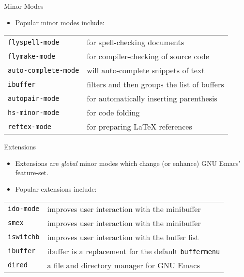 \documentclass[12pt,a4paper,oneside]{beamer}
\begin{document}
\begin{frame}{Minor Modes}
\begin{itemize}
  \item Popular minor modes include:
\end{itemize}
\begin{multicols}
  \begin{tabular}{@{}ll@{}}
  \texttt{flyspell-mode} & for spell-checking documents\\
  \texttt{flymake-mode} & for compiler-checking of source code\\
  \texttt{auto-complete-mode} & will auto-complete snippets of text\\
  \texttt{ibuffer} & filters and then groups the list of buffers\\
  \texttt{autopair-mode} & for automatically inserting parenthesis\\
  \texttt{hs-minor-mode} & for code folding\\
  \texttt{reftex-mode} & for preparing {\LaTeX} references
  \end{tabular}
\end{multicols}
\end{frame}

\begin{frame}{Extensions}
\begin{itemize}
  \item Extensions are \emph{global} minor modes which change (or enhance) GNU Emacs' feature-set.\newline
  \item Popular extensions include:
\end{itemize}
\begin{multicols}
  \begin{tabular}{@{}ll@{}}
    \texttt{ido-mode} & improves user interaction with the minibuffer\\
    \texttt{smex} & improves user interaction with the minibuffer\\
    \texttt{iswitchb} & improves user interaction with the buffer list\\
    \texttt{ibuffer} & ibuffer is a replacement for the default \texttt{buffermenu}\\
    \texttt{dired} & a file and directory manager for GNU Emacs
  \end{tabular}
\end{multicols}
\end{frame}
\end{document}
